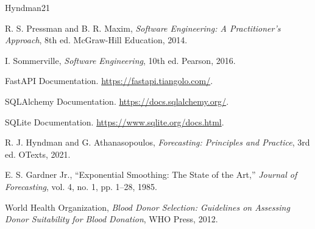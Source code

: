 \documentclass[12pt,twoside]{report}
\begin{document}
\clearpage
{}
\begin{thebibliography}{Hyndman21}

 R. S. Pressman and B. R. Maxim, \textit{Software Engineering: A Practitioner's Approach}, 8th ed. McGraw-Hill Education, 2014.

 I. Sommerville, \textit{Software Engineering}, 10th ed. Pearson, 2016.

 FastAPI Documentation. \url{https://fastapi.tiangolo.com/}.

 SQLAlchemy Documentation. \url{https://docs.sqlalchemy.org/}.

 SQLite Documentation. \url{https://www.sqlite.org/docs.html}.

 R. J. Hyndman and G. Athanasopoulos, \textit{Forecasting: Principles and Practice}, 3rd ed. OTexts, 2021.

 E. S. Gardner Jr., ``Exponential Smoothing: The State of the Art,'' \textit{Journal of Forecasting}, vol. 4, no. 1, pp. 1--28, 1985.

 World Health Organization, \textit{Blood Donor Selection: Guidelines on Assessing Donor Suitability for Blood Donation}, WHO Press, 2012.

\end{thebibliography}
\end{document}
